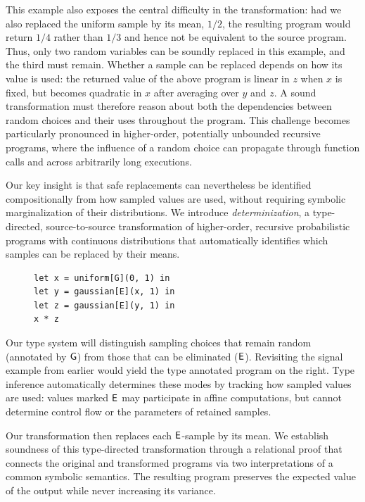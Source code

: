 This example also exposes the central difficulty in the transformation: had we also replaced the
 uniform sample by its mean, $1/2$, the resulting program would 
return $1/4$ rather than $1/3$ and hence not be equivalent to the source program. Thus, only two random variables can be soundly replaced in this example, and
the third must remain. Whether a sample can be replaced depends on how its value is used: the returned value of the above program is linear in $z$ when $x$ is fixed,
but becomes quadratic in $x$ after averaging over $y$ and $z$. A sound
transformation must therefore reason about both the dependencies
between random choices and their uses throughout the program. This challenge becomes particularly pronounced in higher-order, potentially unbounded recursive programs, where the influence of a random choice can propagate through function calls and across arbitrarily long executions. 

Our key insight is that safe replacements can nevertheless be
identified compositionally from how sampled values are used,
without requiring symbolic marginalization of their distributions.
We introduce \emph{determinization}, a type-directed,
source-to-source transformation of higher-order, recursive
probabilistic programs with continuous distributions that
automatically identifies which samples can be replaced by
their means. 

\begin{figure}
\vspace{-1.75em}
\begin{lstlisting}[xleftmargin=0pt]
let x = uniform[G](0, 1) in
let y = gaussian[E](x, 1) in
let z = gaussian[E](y, 1) in
x * z
\end{lstlisting}
\vspace{-2em}
\end{figure}
Our type system will distinguish sampling choices
that remain random (annotated by $\mathsf{G}$) from those that can be eliminated
($\mathsf{E}$). Revisiting the signal example from earlier would yield the type annotated program on the right. Type inference automatically determines these modes by tracking
how sampled values are used: values marked $\mathsf{E}$ may
participate in affine computations, but cannot determine
control flow or the parameters of retained samples. 

Our transformation then replaces each $\mathsf{E}$-sample by
its mean. We establish soundness of this type-directed transformation through a
relational proof that connects the original and transformed
programs via two interpretations of a common symbolic
semantics. The resulting program
preserves the expected value of the output while never
increasing its variance.

